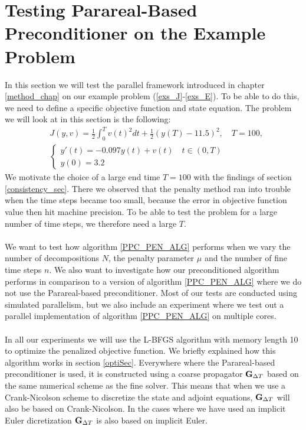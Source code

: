 \section{Testing Parareal-Based Preconditioner on the Example Problem}
In this section we will test the parallel framework introduced in chapter \ref{method_chap} on our example problem (\ref{exs_J}-\ref{exs_E}). To be able to do this, we need to define a specific objective function and state equation. The problem we will look at in this section is the following:
\begin{align}
&J(y,v) = \frac{1}{2}\int_0^{T}v(t)^2dt + \frac{1}{2}(y(T)-11.5)^2,\quad T=100, \label{speed_j}\\
&\left\{
     \begin{array}{lr}
       	y'(t)=-0.097y(t) + v(t) \quad t\in(0,T)\\
       	y(0)=3.2
     \end{array}
   \right. \label{speed_e}
\end{align}
We motivate the choice of a large end time $T=100$ with the findings of section \ref{consistency_sec}. There we observed that the penalty method ran into trouble when the time steps became too small, because the error in objective function value then hit machine precision. To be able to test the problem for a large number of time steps, we therefore need a large $T$.
\\
\\
We want to test how algorithm \ref{PPC_PEN_ALG} performs when we vary the number of decompositions $N$, the penalty parameter $\mu$ and the number of fine time steps $n$. We also want to investigate how our preconditioned algorithm performs in comparison to a version of algorithm \ref{PPC_PEN_ALG} where we do not use the Parareal-based preconditioner. Most of our tests are conducted using simulated parallelism, but we also include an experiment where we test out a parallel implementation of algorithm \ref{PPC_PEN_ALG} on multiple cores.
\\
\\
In all our experiments we will use the L-BFGS algorithm\cite{nocedal1980updating} with memory length 10 to optimize the penalized objective function. We briefly explained how this algorithm works in section \ref{optiSec}. Everywhere where the Parareal-based preconditioner is used, it is constructed using a coarse propagator $\bold G_{\Delta T}$ based on the same numerical scheme as the fine solver. This means that when we use a Crank-Nicolson scheme to discretize the state and adjoint equations, $\bold G_{\Delta T}$ will also be based on Crank-Nicolson. In the cases where we have used an implicit Euler dicretization $\bold G_{\Delta T}$ is also based on implicit Euler.
